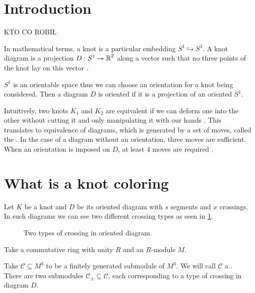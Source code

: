 \section{Introduction}

{\large\color{red}KTO CO ROBIŁ}

In mathematical terms, a knot is a particular embedding $S^1\hookrightarrow S^3$. A knot diagram is a projection $D:S^1\twoheadrightarrow \operatorname{\mathbb{R}}^2$ along a vector such that no three points of the knot lay on this vector \cite{likorish-diagram}.

$S^1$ is an orientable space thus we can choose an orientation for a knot being considered. Then a diagram $D$ is oriented if it is a projection of an oriented $S^1$.

Intuitively, two knots $K_1$ and $K_2$ are equivalent if we can deform one into the other without cutting it and only manipulating it with our hands \cite{murasagi-equivalence}. This translates to equivalence of diagrams, which is generated by a set of moves, called the . In the case of a diagram without an orientation, three moves are sufficient. When an orientation is imposed on $D$, at least $4$ moves are required \cite{ruchy_zorientowane}.

\section{What is a knot coloring}

Let $K$ be a knot and $D$ be its oriented diagram with $s$ segments and $x$ crossings. In such diagrams we can see two different crossing types as seen in \cref{crossing_type}. 
\begin{figure}[h]\centering
  \caption{Two types of crossing in oriented diagram.\label{crossing_type}}
\end{figure}

Take a commutative ring with unity $R$ and an $R$-module $M$.

\begin{definition}
  Take $\mathcal{C}\subseteq M^3$ to be a finitely generated submodule of $M^3$. We will call $\mathcal{C}$ a . There are two submodules $\mathcal{C}_\pm\subseteq \mathcal{C}$, each corresponding to a type of crossing in diagram $D$. 
\end{definition}

